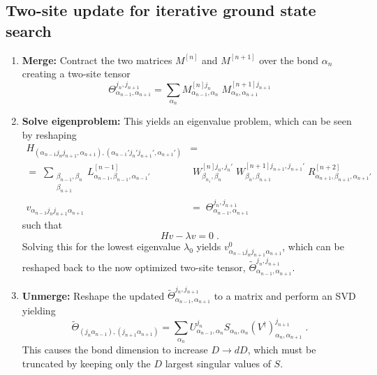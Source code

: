 \subsection{Two-site update for iterative ground state search}
\begin{enumerate}
\item
\textbf{Merge:} Contract the two matrices $M^{[n]}$ and $M^{[n+1]}$ over the bond $\alpha_{n}$ creating a two-site tensor
\begin{equation}
\Theta_{\alpha_{n-1} , \alpha_{n+1}}^{j_n , j_{n+1}} = \sum_{\alpha_n} M_{\alpha_{n-1} , \alpha_{n}}^{[n] j_n } \;  M_{\alpha_{n} , \alpha_{n+1}}^{[n+1] j_{n+1} } 
\end{equation}

\item
\textbf{Solve eigenproblem:} This yields an eigenvalue problem, which can be seen by reshaping
\begin{align}
	H_{( \alpha_{n-1}  j_n  j_{n+1}, \alpha_{n+1}),(\alpha_{n-1}'  j_n '  j_{n+1}', \alpha_{n+1}')} &= \nonumber \\
	= \; \sum_{\substack{\beta_{n-1} , \beta_n \\ \beta_{n+1}}} L_{\alpha_{n-1}, \beta_{n-1} , \alpha_{n-1} '}^{[n-1]} & \; W_{\beta_{n_1}, \beta_n}^{[n] j_n , j_n '} \; W_{\beta_{n}, \beta_{n+1}}^{[n+1] j_{n+1} , j_{n+1} '}\;  R_{\alpha_{n+1} ,\beta_{n+1} , \alpha_{n+1} '}^{[n+2]} \\
	v_{ \alpha_{n-1} j_n j_{n+1} \alpha_{n+1}} &= \; \Theta_{\alpha_{n-1} , \alpha_{n+1}}^{j_n , j_{n+1}}
\end{align}
such that
\begin{equation}
	H v - \lambda v = 0 \; .
	\label{eq:eigprob}
\end{equation}
Solving this for the lowest eigenvalue $\lambda_0$ yields $v_{ \alpha_{n-1} j_n j_{n+1} \alpha_{n+1}}^0$, which can be reshaped back to the now optimized two-site tensor, $\tilde{\Theta}_{\alpha_{n-1} , \alpha_{n+1}}^{j_n , j_{n+1}}$.

\item
\textbf{Unmerge:} Reshape the updated $\tilde{\Theta}_{\alpha_{n-1} , \alpha_{n+1}}^{j_n , j_{n+1}}$ to a matrix and perform an SVD yielding
\begin{equation}
	\tilde{\Theta}_{(j_n \alpha_{n-1} ) ,(j_{n+1}  \alpha_{n+1} )} = \sum_{\alpha_n} U_{\alpha_{n-1} , \alpha_{n}}^{j_n} S_{\alpha_n , \alpha_n} (V^{\dag})_{\alpha_{n} , \alpha_{n+1}}^{j_{n+1}} \; .
\end{equation}
This causes the bond dimension to increase $D \rightarrow d D$, which must be truncated by keeping only the $D$ largest singular values of $S$. 


\end{enumerate}
